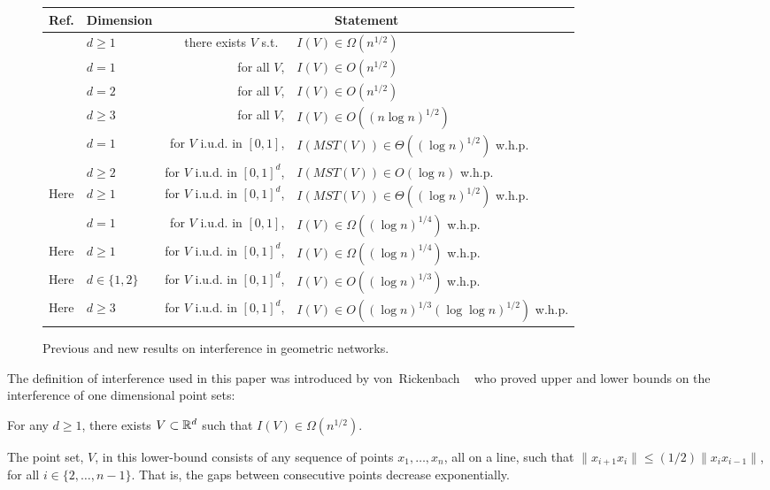 \documentclass{patmorin}
\newcommand{\mst}{\mathit{MST}}
\begin{document}
\begin{figure}
\begin{center}
  \begin{tabular}{|l|l|r@{ }l|}\hline
    Ref. & Dimension & \multicolumn{2}{c|}{Statement} \\ \hline
    \cite{vR05} & $d\ge 1$ & there exists $V$ s.t.\ & $I(V)\in \Omega(n^{1/2})$ \\
    \cite{vR05} & $d=1$ & for all $V$, & $I(V)\in O(n^{1/2})$ \\
    \cite{ht08} & $d=2$ & for all $V$, & $I(V)\in O(n^{1/2})$ \\
    \cite{ht08} & $d\ge 3$ & for all $V$, & $I(V)\in O((n\log n)^{1/2})$ \\
    \cite{kkmns10} & $d= 1$ & for $V$ i.u.d. in $[0,1]$, & $I(\mst(V))\in \Theta((\log n)^{1/2})$ w.h.p. \\
    \cite{kdh11} & $d\ge 2$ & for $V$ i.u.d. in $[0,1]^d$, & $I(\mst(V))\in O(\log n)$ w.h.p.  \\
    Here & $d\ge 1$ & for $V$ i.u.d. in $[0,1]^d$, & $I(\mst(V))\in \Theta((\log n)^{1/2})$ w.h.p.  \\ 
    \cite{kkmns10,vR05} & $d = 1$ & for $V$ i.u.d. in $[0,1]$, & $I(V)\in\Omega((\log n)^{1/4})$ w.h.p.  \\
    Here & $d\ge 1$ & for $V$ i.u.d. in $[0,1]^d$,  & $I(V)\in \Omega((\log n)^{1/4})$ w.h.p.  \\ 
    Here & $d\in\{1,2\}$ & for $V$ i.u.d. in $[0,1]^d$, & $I(V)\in O((\log n)^{1/3})$ w.h.p.  \\
    Here & $d\ge 3$ & for $V$ i.u.d. in $[0,1]^d$, & $I(V)\in O((\log n)^{1/3}(\log\log n)^{1/2})$ w.h.p.  \\
  \hline
  \end{tabular}
\end{center}
\caption{Previous and new results on interference in geometric networks.}
\end{figure}

The definition of interference used in this paper was introduced by
von~Rickenbach \etal\ \cite{vR05} who proved upper and
lower bounds on the interference of one dimensional point sets:
\begin{thm}
For any $d\ge 1$, there exists $V\subset\mathbb{R}^{d}$ such
that $I(V)\in\Omega(n^{1/2})$.
\end{thm}
The point set, $V$, in this lower-bound consists of any sequence of
points $x_1,\ldots,x_n$, all on a line, such that $\|x_{i+1}x_i\| \le (1/2)\|x_{i}x_{i-1}\|$,
for all $i\in\{2,\ldots,n-1\}$.  That is, the gaps between consecutive
points decrease exponentially.
\end{document}
